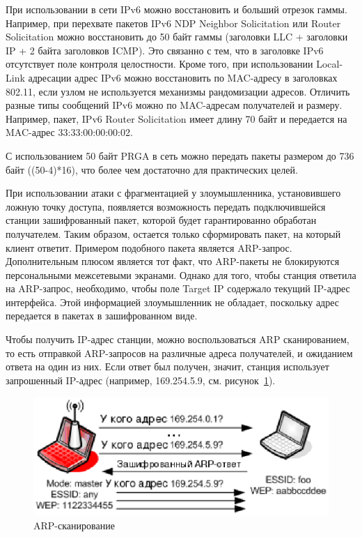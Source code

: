 При использовании в сети IPv6 можно восстановить и больший отрезок гаммы.
Например, при перехвате пакетов IPv6 NDP Neighbor Solicitation или Router
Solicitation можно восстановить до 50 байт гаммы (заголовки LLC + заголовки IP +
2 байта заголовков ICMP). Это связанно с тем, что в заголовке IPv6 отсутствует
поле контроля целостности. Кроме того, при использовании Local-Link адресации
адрес IPv6 можно восстановить по MAC-адресу в заголовках 802.11, если узлом не
используется механизмы рандомизации адресов. Отличить разные типы сообщений IPv6
можно по MAC-адресам получателей и размеру. Например, пакет, IPv6 Router
Solicitation имеет длину 70 байт и передается на MAC-адрес 33:33:00:00:00:02.

С использованием 50 байт PRGA в сеть можно передать пакеты размером до 736 байт
((50-4)*16), что более чем достаточно для практических целей.


При использовании атаки с фрагментацией у злоумышленника, установившего ложную
точку доступа, появляется возможность передать подключившейся станции
зашифрованный пакет, которой будет гарантированно обработан получателем. Таким
образом, остается только сформировать пакет, на который клиент ответит. Примером
подобного пакета является ARP-запрос. Дополнительным плюсом является тот факт,
что ARP-пакеты не блокируются персональными межсетевыми экранами. Однако для
того, чтобы станция ответила на ARP-запрос, необходимо, чтобы поле Target IP
содержало текущий IP-адрес интерфейса. Этой информацией злоумышленник не
обладает, поскольку адрес передается в пакетах в зашифрованном виде.

Чтобы получить IP-адрес станции, можно воспользоваться ARP сканированием, то
есть отправкой ARP-запросов на различные адреса получателей, и ожиданием ответа
на один из них. Если ответ был получен, значит, станция использует запрошенный
IP-адрес (например, 169.254.5.9, см. рисунок~\ref{fig:arp_scanning}).

\begin{figure}
    \includegraphics[width=1\textwidth]{graphics/arp_scanning.eps}
    \caption{ARP-сканирование}
    \label{fig:arp_scanning}
\end{figure}

